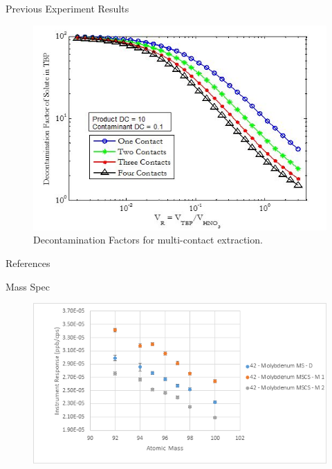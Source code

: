\documentclass{beamer}
\begin{document}
\begin{frame}{Previous Experiment Results}
  \begin{figure}[H]
    \vspace*{-.1cm}
    \begin{center}
      \includegraphics[scale = 0.6]{df}
      \vspace{-0.5cm}
      \caption{\tiny{Decontamination Factors for multi-contact extraction.}}
    \end{center}
  \end{figure}
\end{frame}

\begin{frame}[allowframebreaks]{References}
\def\newblock{}
\nocite{*}
\scriptsize{}

\end{frame}

\begin{frame}{Mass Spec}
  \begin{figure}[H]
    \vspace*{-1cm}
    \begin{center}
      \includegraphics[scale = 0.75]{instrument_response}
    \end{center}
  \end{figure}
\end{frame}
\end{document}
